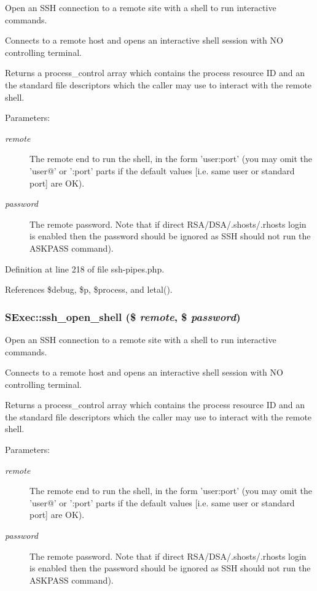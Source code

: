 Open an SSH connection to a remote site with a shell to run interactive commands. 

Connects to a remote host and opens an interactive shell session with NO controlling terminal.

Returns a process\_\-control array which contains the process resource ID and an the standard file descriptors which the caller may use to interact with the remote shell.

\begin{Desc}
\item[Parameters:]
\begin{description}
\item[{\em remote}]The remote end to run the shell, in the form 'user:port' (you may omit the 'user@' or ':port' parts if the default values [i.e. same user or standard port] are OK). \item[{\em password}]The remote password. Note that if direct RSA/DSA/.shosts/.rhosts login is enabled then the password should be ignored as SSH should not run the ASKPASS command). \end{description}
\end{Desc}


Definition at line 218 of file ssh-pipes.php.

References \$debug, \$p, \$process, and letal().
\subsubsection{\setlength{\rightskip}{0pt plus 5cm}SExec::ssh\_\-open\_\-shell (\$ {\em remote}, \$ {\em password})}\label{classSExec_a5}


Open an SSH connection to a remote site with a shell to run interactive commands. 

Connects to a remote host and opens an interactive shell session with NO controlling terminal.

Returns a process\_\-control array which contains the process resource ID and an the standard file descriptors which the caller may use to interact with the remote shell.

\begin{Desc}
\item[Parameters:]
\begin{description}
\item[{\em remote}]The remote end to run the shell, in the form 'user:port' (you may omit the 'user@' or ':port' parts if the default values [i.e. same user or standard port] are OK). \item[{\em password}]The remote password. Note that if direct RSA/DSA/.shosts/.rhosts login is enabled then the password should be ignored as SSH should not run the ASKPASS command). \end{description}
\end{Desc}


